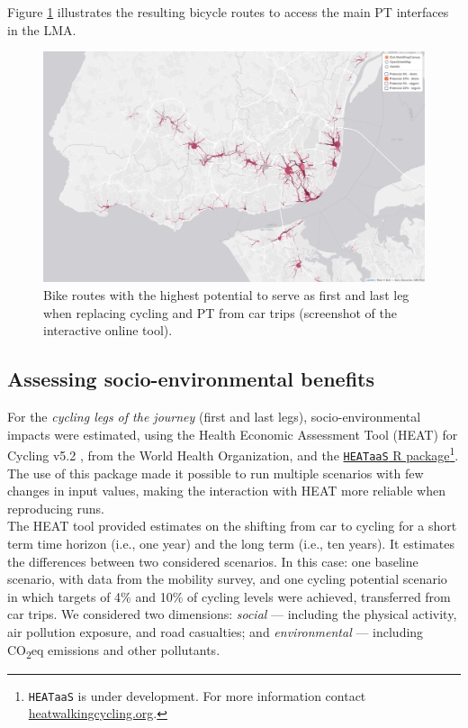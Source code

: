 \documentclass[review, doubleblind, 3p,
authoryear]{elsarticle} %
\begin{document}
Figure \ref{fig:map2} illustrates the resulting bicycle routes to access
the main PT interfaces in the LMA.

\begin{figure}

{\centering \includegraphics[width=0.8\linewidth,]{img/map2} 

}

\caption{Bike routes with the highest potential to serve as first and last leg when replacing cycling and PT from car trips (screenshot of the interactive online tool).}\label{fig:map2}
\end{figure}

\subsection{Assessing socio-environmental
benefits}\label{assessing-socio-environmental-benefits}

For the \emph{cycling legs of the journey} (first and last legs),
socio-environmental impacts were estimated, using the Health Economic
Assessment Tool (HEAT) for Cycling v5.2 \citep{HEAT}, from the World
Health Organization, and the
\href{https://github.com/HEAT-WHO/HEAT_heatr_api}{\texttt{HEATaaS} R
package}\footnote{\texttt{HEATaaS} is under development. For more
  information contact
  \href{https://heatwalkingcycling.org}{heatwalkingcycling.org}.}. The
use of this package made it possible to run multiple scenarios with few
changes in input values, making the interaction with HEAT more reliable
when reproducing runs.\\
The HEAT tool provided estimates on the shifting from car to cycling for
a short term time horizon (i.e., one year) and the long term (i.e., ten
years). It estimates the differences between two considered scenarios.
In this case: one baseline scenario, with data from the mobility survey,
and one cycling potential scenario in which targets of 4\% and 10\% of
cycling levels were achieved, transferred from car trips. We considered
two dimensions: \emph{social} --- including the physical activity, air
pollution exposure, and road casualties; and \emph{environmental} ---
including CO\textsubscript{2}eq emissions and other pollutants.
\end{document}
